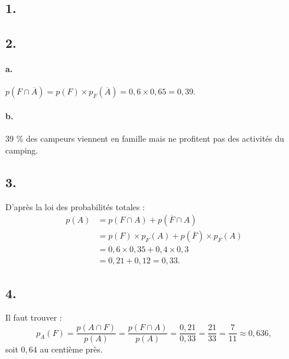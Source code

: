 \subsection*{1.}

\begin{center}
\end{center}

\subsection*{2.}

\paragraph{a.} \(p(F \cap \overline{A}) = p(F) \times p_F(\overline{A}) = 0{,}6 \times 0{,}65 = 0{,}39\).

\paragraph{b.} 39 \% des campeurs viennent en famille mais ne profitent pas des activités du camping.

\subsection*{3.}

D'après la loi des probabilités totales :
\begin{align*}
p(A) &= p(F \cap A) + p(\overline{F} \cap A) \\
&= p(F) \times p_F(A) + p(\overline{F}) \times p_{\overline{F}}(A) \\
&= 0{,}6 \times 0{,}35 + 0{,}4 \times 0{,}3 \\
&= 0{,}21 + 0{,}12 = 0{,}33.
\end{align*}

\subsection*{4.}

Il faut trouver :
\[
p_{A}(F) = \dfrac{p(A \cap F)}{p(A)} = \dfrac{p(F \cap A)}{p(A)} = \dfrac{0{,}21}{0{,}33} = \dfrac{21}{33} = \dfrac{7}{11} \approx 0{,}636,
\]
soit \(0{,}64\) au centième près.
